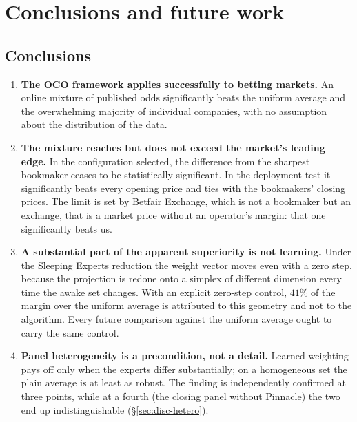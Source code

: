 \documentclass[12pt,a4paper,oneside]{report}
\renewcommand{\_}{\oldunderscore\allowbreak}
\theoremstyle{definition}
\theoremstyle{plain}
\theoremstyle{remark}
\begin{document}
\chapter{Conclusions and future work}
\label{ch:conclusion}

\section{Conclusions}

\begin{enumerate}
  \item \textbf{The OCO framework applies successfully to betting markets.} An online mixture of
        published odds significantly beats the uniform average and the overwhelming majority of
        individual companies, with no assumption about the distribution of the data.

  \item \textbf{The mixture reaches but does not exceed the market's leading edge.} In the
        configuration selected, the difference from the sharpest bookmaker ceases to be
        statistically significant. In the deployment test it significantly beats every opening
        price and ties with the bookmakers' closing prices. The limit is set by Betfair Exchange,
        which is not a bookmaker but an exchange, that is a market price without an operator's
        margin: that one significantly beats us.

  \item \textbf{A substantial part of the apparent superiority is not learning.} Under the
        Sleeping Experts reduction the weight vector moves even with a zero step, because the
        projection is redone onto a simplex of different dimension every time the awake set
        changes. With an explicit zero-step control, $41\%$ of the margin over the uniform average
        is attributed to this geometry and not to the algorithm. Every future comparison against
        the uniform average ought to carry the same control.

  \item \textbf{Panel heterogeneity is a precondition, not a detail.} Learned weighting pays off
        only when the experts differ substantially; on a homogeneous set the plain average is at
        least as robust. The finding is independently confirmed at three points, while at a fourth
        (the closing panel without Pinnacle) the two end up indistinguishable
        (\S\ref{sec:disc-hetero}).


\end{enumerate}
\end{document}
